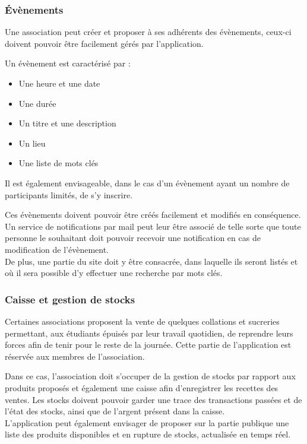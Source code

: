 \documentclass[a4paper,12pt]{article}
\begin{document}
\subsubsection{Évènements}
	Une association peut créer et proposer à ses adhérents des évènements, ceux-ci doivent pouvoir être facilement gérés par l'application.
\par
	Un évènement est caractérisé par :
\begin{itemize}
	\item Une heure et une date
	\item Une durée
	\item Un titre et une description
	\item Un lieu
	\item Une liste de mots clés
\end{itemize}
Il est également envisageable, dans le cas d'un évènement ayant un nombre de participants limités, de s'y inscrire.
\par
	Ces évènements doivent pouvoir être créés facilement et modifiés en conséquence. Un service de notifications par mail peut leur être associé de telle sorte que toute personne le souhaitant doit pouvoir recevoir une notification en cas de modification de l'évènement.\\
De plus, une partie du site doit y être consacrée, dans laquelle ils seront listés et où il sera possible d'y effectuer une recherche par mots clés.

\subsubsection{Caisse et gestion de stocks}
	Certaines associations proposent la vente de quelques collations et sucreries permettant, aux étudiants épuisés par leur travail quotidien, de reprendre leurs forces afin de tenir pour le reste de la journée. Cette partie de l'application est réservée aux membres de l'association.
\par
	Dans ce cas, l'association doit s'occuper de la gestion de stocks par rapport aux produits proposés et également une caisse afin d'enregistrer les recettes des ventes. Les stocks doivent pouvoir garder une trace des transactions passées et de l'état des stocks, ainsi que de l'argent présent dans la caisse.\\
L'application peut également envisager de proposer sur la partie publique une liste des produits disponibles et en rupture de stocks, actualisée en temps réel.
\end{document}
